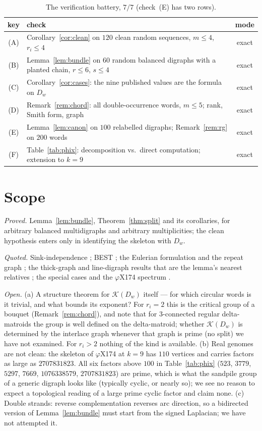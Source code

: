 \documentclass[11pt]{article}
\theoremstyle{plain}
\theoremstyle{definition}
\theoremstyle{remark}
\newcommand{\K}{\mathcal{K}}
\begin{document}
\begin{table}[ht]
\centering\small
\begin{tabular}{clc}
\toprule
key & check & mode\\
\midrule
(A) & Corollary~\ref{cor:clean} on $120$ clean random sequences, $m\le4$, $r_i\le4$ & exact\\
(B) & Lemma~\ref{lem:bundle} on $60$ random balanced digraphs with a planted chain, $r\le6$, $s\le4$ & exact\\
(C) & Corollary~\ref{cor:cases}: the nine published values are the formula on $D_w$ & exact\\
(D) & Remark~\ref{rem:chord}: all double-occurrence words, $m\le5$; rank, Smith form, graph & exact\\
(E) & Lemma~\ref{lem:canon} on $100$ relabelled digraphs; Remark~\ref{rem:rg} on $200$ words & exact\\
(F) & Table~\ref{tab:phix}: decomposition vs.\ direct computation; extension to $k=9$ & exact\\
\bottomrule
\end{tabular}
\caption{The verification battery, $7/7$ (check~(E) has two rows).}
\label{tab:battery}
\end{table}

\section{Scope}\label{sec:scope}

\emph{Proved.} Lemma~\ref{lem:bundle}, Theorem~\ref{thm:split} and its corollaries, for
arbitrary balanced multidigraphs and arbitrary multiplicities; the clean hypothesis
enters only in identifying the skeleton with $D_w$.

\emph{Quoted.} Sink-independence \cite{HLMPPW}; BEST \cite{AEdB,SmithTutte}; the
Eulerian formulation and the repeat graph \cite{PTW,PTT,Flye}; the thick-graph and
line-digraph results that are the lemma's nearest relatives
\cite{ChenSchedler,Alar,Levine,PSX}; the special cases and the $\varphi$X174 spectrum
\cite{Bio1,Bio2}.

\emph{Open.} (a) A structure theorem for $\K(D_w)$ itself --- for which circular words is
it trivial, and what bounds its exponent? For $r_i=2$ this is the critical group of a
bouquet (Remark~\ref{rem:chord}), and \cite{MMN} note that for $3$-connected regular
delta-matroids the group is well defined on the delta-matroid; whether $\K(D_w)$ is
determined by the interlace graph whenever that graph is prime (no split) we have not
examined. For $r_i>2$ nothing of the kind is available. (b) Real genomes are not clean: the
skeleton of $\varphi$X174 at $k=9$ has $110$ vertices and carries factors as large as
$2707831823$. All six factors above $100$ in Table~\ref{tab:phix} ($523$, $3779$, $5297$,
$7669$, $1076338579$, $2707831823$) are prime, which is what the sandpile group of a
generic digraph looks like (typically cyclic, or nearly so); we see no reason to expect a
topological reading of a large prime cyclic factor and claim none. (c) Double strands: reverse complementation reverses arc
direction, so a bidirected version of Lemma~\ref{lem:bundle} must start from the signed
Laplacian; we have not attempted it.
\end{document}

